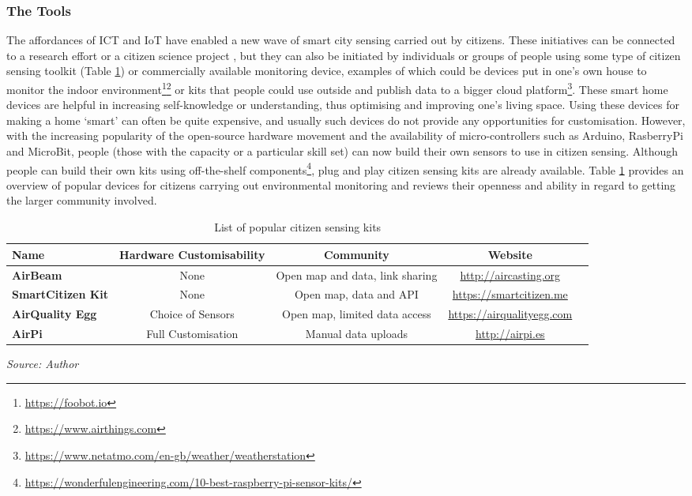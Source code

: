 \subsubsection{The Tools}
\label{sub:sensetools}
The affordances of ICT and IoT have enabled a new wave of smart city sensing carried out by citizens. These initiatives can be connected to a research effort or a citizen science project \citep{haklay_citizen_2013}, but they can also be initiated by individuals or groups of people using some type of citizen sensing toolkit (Table \ref{table:citizen_kits}) or commercially available monitoring device, examples of which could be devices put in one's own house to monitor the indoor environment\footnote{\url{https://foobot.io}}\footnote{\url{https://www.airthings.com}} or kits that people could use outside and publish data to a bigger cloud platform\footnote{\url{https://www.netatmo.com/en-gb/weather/weatherstation}}. These smart home devices are helpful in increasing self-knowledge or understanding, thus optimising and improving one's living space. Using these devices for making a home `smart' can often be quite expensive, and usually such devices do not provide any opportunities for customisation. However, with the increasing popularity of the open-source hardware movement and the availability of micro-controllers such as Arduino, RasberryPi and MicroBit, people (those with the capacity or a particular skill set) can now build their own sensors to use in citizen sensing. Although people can build their own kits using off-the-shelf components\footnote{\url{https://wonderfulengineering.com/10-best-raspberry-pi-sensor-kits/}}, plug and play citizen sensing kits are already available. Table \ref{table:citizen_kits} provides an overview of popular devices for citizens carrying out environmental monitoring and reviews their openness and ability in regard to getting the larger community involved.

\begin{table}[hbt!]
\scriptsize
\centering
\begin{tabular}{|l|c|c|c|c|}
\hline
\textbf{Name} & \textbf{Hardware Customisability} & \textbf{Community}  & \textbf{Website}\\[0.5ex]
\hline
\rowcolor[gray]{.9}\textbf{AirBeam}	& None & Open map and data, link sharing & \href{http://aircasting.org}{http://aircasting.org} \\
\hline
\textbf{SmartCitizen Kit} & None & Open map, data and API	& \href{https://smartcitizen.me}{https://smartcitizen.me} \\
\hline
\rowcolor[gray]{.9}\textbf{AirQuality Egg} & Choice of Sensors& Open map, limited data access & \href{https://airqualityegg.com}{https://airqualityegg.com} \\
\hline
\textbf{AirPi} & Full Customisation & Manual data uploads & \href{http://airpi.es}{http://airpi.es} \\ [0.5ex]
\hline
\end{tabular}

\smallskip\centering
    \footnotesize\emph{Source: Author}
\caption[Citizen Sensing Kits]{List of popular citizen sensing kits}    
\label{table:citizen_kits}    
\end{table}

